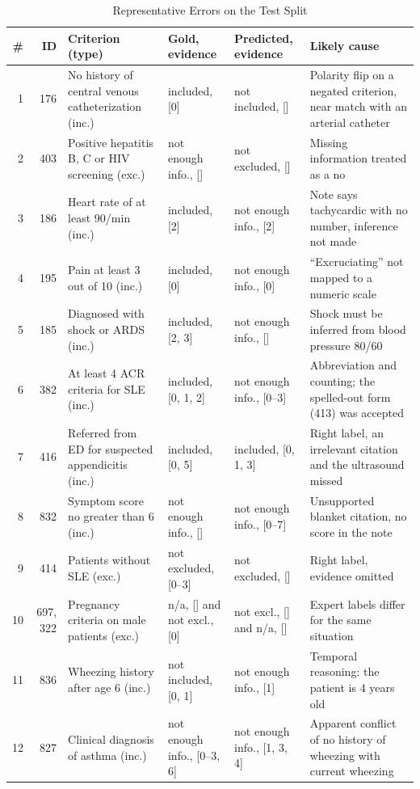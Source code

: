\documentclass[conference]{IEEEtran}
\begin{document}
\begin{table}[t]
\caption{Representative Errors on the Test Split}
\label{tab:errors}
\centering
\footnotesize
\begin{tabular}{@{}rrp{4.3cm}p{2.2cm}p{2.2cm}p{5.6cm}@{}}
\toprule
\# & ID & Criterion (type) & Gold, evidence & Predicted, evidence & Likely cause \\
\midrule
1 & 176 & No history of central venous catheterization (inc.) & included, [0] & not included, [] & Polarity flip on a negated criterion, near match with an arterial catheter \\
2 & 403 & Positive hepatitis B, C or HIV screening (exc.) & not enough info., [] & not excluded, [] & Missing information treated as a no \\
3 & 186 & Heart rate of at least 90/min (inc.) & included, [2] & not enough info., [2] & Note says tachycardic with no number, inference not made \\
4 & 195 & Pain at least 3 out of 10 (inc.) & included, [0] & not enough info., [0] & ``Excruciating'' not mapped to a numeric scale \\
5 & 185 & Diagnosed with shock or ARDS (inc.) & included, [2, 3] & not enough info., [] & Shock must be inferred from blood pressure 80/60 \\
6 & 382 & At least 4 ACR criteria for SLE (inc.) & included, [0, 1, 2] & not enough info., [0--3] & Abbreviation and counting; the spelled-out form (413) was accepted \\
7 & 416 & Referred from ED for suspected appendicitis (inc.) & included, [0, 5] & included, [0, 1, 3] & Right label, an irrelevant citation and the ultrasound missed \\
8 & 832 & Symptom score no greater than 6 (inc.) & not enough info., [] & not enough info., [0--7] & Unsupported blanket citation, no score in the note \\
9 & 414 & Patients without SLE (exc.) & not excluded, [0--3] & not excluded, [] & Right label, evidence omitted \\
10 & 697, 322 & Pregnancy criteria on male patients (exc.) & n/a, [] and not excl., [0] & not excl., [] and n/a, [] & Expert labels differ for the same situation \\
11 & 836 & Wheezing history after age 6 (inc.) & not included, [0, 1] & not enough info., [1] & Temporal reasoning: the patient is 4 years old \\
12 & 827 & Clinical diagnosis of asthma (inc.) & not enough info., [0--3, 6] & not enough info., [1, 3, 4] & Apparent conflict of no history of wheezing with current wheezing \\
\bottomrule
\end{tabular}
\end{table}
\end{document}
